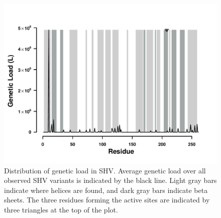 \documentclass[12pt]{article}
\begin{document}
\begin{figure}[H]
     \centering
	\includegraphics[width=\textwidth]{img/GL_slide_SHV2016}
	\caption{Distribution of genetic load in SHV. 
	Average genetic load over all observed SHV variants is indicated by the black line. 
	Light gray bars indicate where helices are found, and dark gray bars indicate beta sheets.
	The three residues forming the active sites are indicated by three triangles at the top of the plot.}
	\label{fig:shv2016_sse}
\end{figure}
\end{document}
